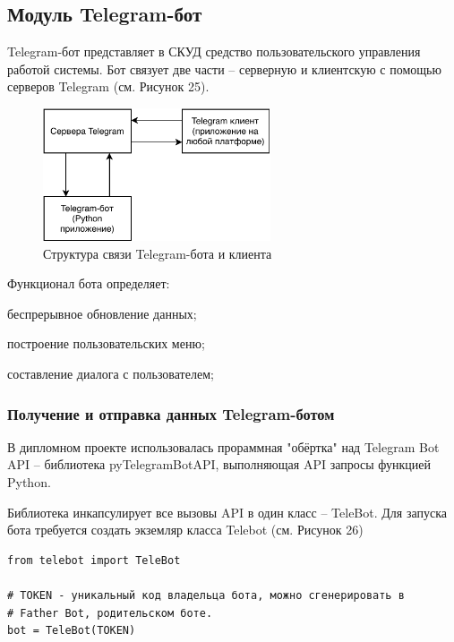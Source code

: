 \subsection{Модуль Telegram-бот}

Telegram-бот представляет в СКУД средство пользовательского управления работой
системы. Бот связует две части -- серверную и клиентскую с помощью серверов
Telegram (см. Рисунок 25).

\begin{figure}[h!]
  \centering
  \setlength{\fboxsep}{5pt}
  \includegraphics[width=0.6\textwidth]{data-visualisation/telegram-bot-arch}
  \vspace*{6pt}
  \caption{Структура связи Telegram-бота и клиента}\label{fig:image-processing}
\end{figure}

Функционал бота определяет:

\begin{itemize*}
\item беспрерывное обновление данных;
\item построение пользовательских меню;
\item составление диалога с пользователем;
\end{itemize*}

\subsubsection{Получение и отправка данных Telegram-ботом}

В дипломном проекте использовалась прораммная "обёртка" над Telegram Bot API -- библиотека pyTelegramBotAPI, выполняющая API запросы функцией Python. 

Библиотека инкапсулирует все вызовы API в один класс -- TeleBot. Для запуска
бота требуется создать экземляр класса Telebot (см. Рисунок 26)

\begin{lstlisting}
from telebot import TeleBot

# TOKEN - уникальный код владельца бота, можно сгенерировать в 
# Father Bot, родительском боте. 
bot = TeleBot(TOKEN)
\end{lstlisting}

